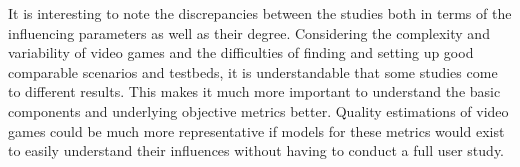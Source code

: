It is interesting to note the discrepancies between the studies both in terms of the influencing parameters as well as their degree. Considering the complexity and variability of video games and the difficulties of finding and setting up good comparable scenarios and testbeds, it is understandable that some studies come to different results. This makes it much more important to understand the basic components and underlying objective metrics better. Quality estimations of video games could be much more representative if models for these metrics would exist to easily understand their influences without having to conduct a full user study.







